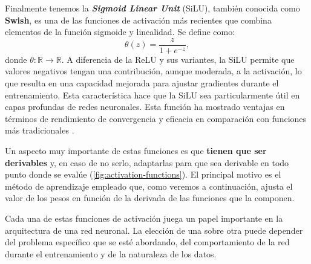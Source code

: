 %
%
Finalmente tenemos la \textbf{\textit{Sigmoid Linear Unit}} (SiLU), también conocida como \textbf{Swish}, es una de las funciones de activación más recientes que combina elementos de la función sigmoide y linealidad. Se define como:
\begin{equation}
	\theta(z) = \frac{z}{1 + e^{-z}},
\end{equation}
donde \(\theta : \mathbb{R} \to \mathbb{R}\). A diferencia de la ReLU y sus variantes, la SiLU permite que valores negativos tengan una contribución, aunque moderada, a la activación, lo que resulta en una capacidad mejorada para ajustar gradientes durante el entrenamiento. Esta característica hace que la SiLU sea particularmente útil en capas profundas de redes neuronales. Esta función ha mostrado ventajas en términos de rendimiento de convergencia y eficacia en comparación con funciones más tradicionales \cite{ramachandran2017searching}.

Un aspecto muy importante de estas funciones es que \textbf{tienen que ser derivables} y, en caso de no serlo, adaptarlas para que sea derivable en todo punto donde se evalúe (\autoref{fig:activation-functions}). El principal motivo es el método de aprendizaje empleado que, como veremos a continuación, ajusta el valor de los pesos en función de la derivada de las funciones que la componen.

Cada una de estas funciones de activación juega un papel importante en la arquitectura de una red neuronal. La elección de una sobre otra puede depender del problema específico que se esté abordando, del comportamiento de la red durante el entrenamiento y de la naturaleza de los datos.


